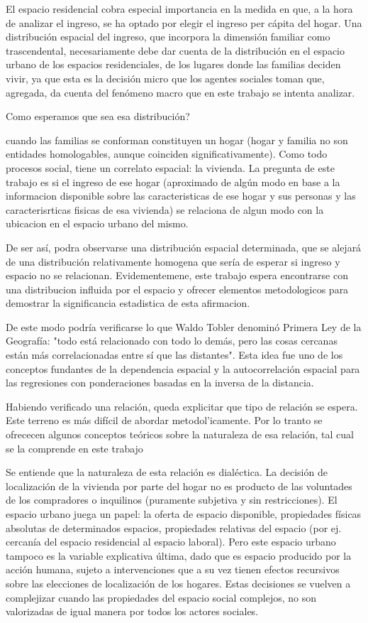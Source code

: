 El espacio residencial cobra especial importancia en la medida en que, a la hora de analizar el ingreso, se ha optado por elegir el ingreso per cápita del hogar. Una distribución espacial del ingreso, que incorpora la dimensión familiar como trascendental, necesariamente debe dar cuenta de la distribución en el espacio urbano de los espacios residenciales, de los lugares donde las familias deciden vivir, ya que esta es la decisión micro que los agentes sociales toman que, agregada, da cuenta del fenómeno macro que en este trabajo se intenta analizar.


Como esperamos que sea esa distribución? 

cuando las familias se conforman constituyen un hogar (hogar y familia no son entidades homologables, aunque coinciden significativamente). Como todo procesos social, tiene un correlato espacial: la vivienda. La pregunta de este trabajo es si el ingreso de ese hogar (aproximado de algún modo en base a la informacion disponible sobre las caracteristicas de ese hogar y sus personas y las caracterisrticas fisicas de esa vivienda) se relaciona de algun modo con la ubicacion en el espacio urbano del mismo.

De ser así, podra observarse una distribución espacial determinada, que se alejará de una distribución relativamente homogena que sería de esperar si ingreso y espacio no se relacionan. Evidementemene, este trabajo espera encontrarse con una distribucion influida por el espacio y ofrecer elementos metodologicos para demostrar la significancia estadistica de esta afirmacion.

De este modo podría verificarse lo que Waldo Tobler \citeyear{tobler} denominó Primera Ley de la Geografía: "todo está relacionado con todo lo demás, pero las cosas cercanas están más correlacionadas entre sí que las distantes". Esta idea fue uno de los conceptos fundantes de la dependencia espacial y la autocorrelación espacial para las regresiones con ponderaciones basadas en la inversa de la distancia. 

Habiendo verificado una relación, queda explicitar que tipo de relación se espera. Este terreno es más difícil de abordar metodol'icamente. Por lo tranto se ofrececen algunos conceptos teóricos sobre la naturaleza de esa relación, tal cual se la comprende en este trabajo  

Se entiende que la naturaleza de esta relación es dialéctica. La decisión de localización de la vivienda por parte del hogar no es producto de las voluntades de los compradores o inquilinos (puramente subjetiva y sin restricciones). El espacio urbano juega un papel: la oferta de espacio disponible, propiedades físicas absolutas de determinados espacios, propiedades relativas del espacio (por ej. cercanía del espacio residencial al espacio laboral). Pero este espacio urbano tampoco es la variable explicativa última, dado que es espacio producido por la acción humana, sujeto a intervenciones que a su vez tienen efectos recursivos sobre las elecciones de localización de los hogares. Estas decisiones se vuelven a complejizar cuando las propiedades del espacio social complejos, no son valorizadas de igual manera por todos los actores sociales. 

